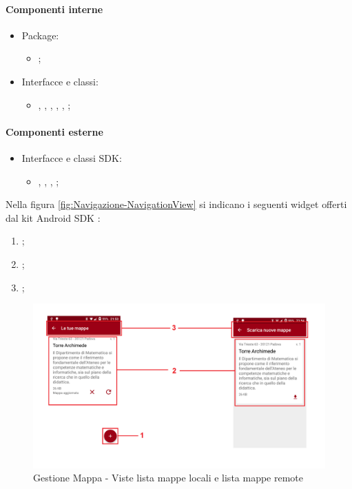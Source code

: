 \documentclass[../Funzionalita.tex]{subfiles}
\begin{document}
			\paragraph*{Componenti interne}
			\begin{itemize}
			
				\item Package:
				\begin{itemize}
					\item[] \view;
				\end{itemize}
				
				\item Interfacce e classi:
				\begin{itemize}
					\item[] \LocalMapManagerView, \LocalMapManagerViewImp, \LocalMapAdapter, \RemoteMapManagerView, \RemoteMapManagerViewImp, \RemoteMapManagerAdapter;
				\end{itemize}
				
			\end{itemize}
			
			
			\paragraph*{Componenti esterne}
			\begin{itemize}
				\item Interfacce e classi SDK:
				\begin{itemize}
					\item[] \AdapterView, \BaseAdapter, \ListView, \FloatingActionButton;
				\end{itemize}
			\end{itemize}
			
			\newpage
			Nella figura \ref{fig:Navigazione-NavigationView} si indicano i seguenti widget offerti dal kit \gls{Android} SDK :
			\begin{enumerate}
				\item \Toolbar;
				\item \ListView;
				\item \FloatingActionButton;
			\end{enumerate}
		
			\begin{figure} [h]
				\centering
				\includegraphics[scale=0.3]{img/GestioneMappe-Views}
				\caption{Gestione Mappa - Viste lista mappe locali e lista mappe remote}
				\label{fig:GestioneMappe-Views}
			\end{figure}
			
\end{document}
